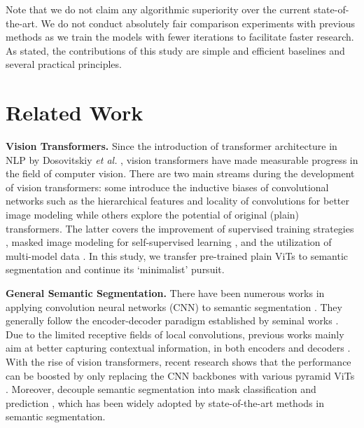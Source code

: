 \documentclass{article} \usepackage{iclr2024_conference,times}
\begin{document}
Note that we do not claim any algorithmic superiority over the current state-of-the-art. We do not conduct absolutely fair comparison experiments with previous methods as we train the models with fewer iterations to facilitate faster research. As stated, the contributions of this study are simple and efficient baselines and several practical principles.

\section{Related Work}

\textbf{Vision Transformers.} Since the introduction of transformer architecture in NLP by Dosovitskiy \textit{et al.} \citep{vaswani2017attention,dosovitskiy2021an}, vision transformers have made measurable progress in the field of computer vision. There are two main streams during the development of vision transformers: some introduce the inductive biases of convolutional networks such as the hierarchical features and locality of convolutions for better image modeling \citep{wang2021pyramid,liu2021swin,yuan2021tokens,chu2021twins,wu2021cvt,wang2022pvt} while others explore the potential of original (plain) transformers. The latter covers the improvement of supervised training strategies \citep{touvron2021training,steiner2021train,touvron2022deit}, masked image modeling for self-supervised learning \citep{he2022masked,bao2022beit,zhou2022image,chen2023context,peng2022beit,fang2023eva}, and the utilization of multi-model data \citep{wang2023image,fang2023eva}. In this study, we transfer pre-trained plain ViTs to semantic segmentation and continue its `minimalist' pursuit.

\textbf{General Semantic Segmentation.} There have been numerous works in applying convolution neural networks (CNN) to semantic segmentation \citep{chen2017deeplab,zhao2017pyramid,peng2017large,lin2017refinenet,zhang2018context,chen2017rethinking,fu2019dual,huang2019ccnet,takikawa2019gated,yuan2021ocnet}. They generally follow the encoder-decoder paradigm established by seminal works \citep{long2015fully,ronneberger2015u}. Due to the limited receptive fields of local convolutions, previous works mainly aim at better capturing contextual information, in both encoders and decoders \citep{chen2017deeplab,zhao2017pyramid,peng2017large,zhang2018context,chen2017rethinking,fu2019dual,huang2019ccnet,yuan2021ocnet}.
With the rise of vision transformers, recent research shows that the performance can be boosted by only replacing the CNN backbones with various pyramid ViTs \citep{liu2021swin,xie2021segformer,yuan2021hrformer,gu2022multi}. Moreover, \cite{cheng2021per,cheng2022masked} decouple semantic segmentation into mask classification and prediction , which has been widely adopted by state-of-the-art methods in semantic segmentation.
\end{document}
